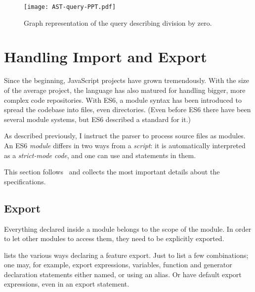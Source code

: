 \begin{figure}[!htb]
  \centering
  \texttt{[image: AST-query-PPT.pdf]}
  \caption{Graph representation of the query describing division by zero.}
  \label{fig:AST-query-PPT}
\end{figure}


\section{Handling Import and Export}
\label{sect:handling-import-export}
Since the beginning, JavaScript projects have grown tremendously. With the size of the average project, the language has also matured for handling bigger, more complex code repositories. With ES6, a module syntax has been introduced to spread the codebase into files, even directories. (Even before ES6 there have been several module systems, but ES6 described a standard for it.)

As described previously, I instruct the parser to process source files as modules. An ES6 \emph{module} differs in two ways from a \emph{script}: it is automatically interpreted as a \emph{strict-mode code}, and one can use  and  statements in them.

This section follows~\cite{ES6InDepth,ES6import,ES6export} and collects the most important details about the specifications.


\subsection{Export}
Everything declared inside a module belongs to the scope of the module. In order to let other modules to access them, they need to be explicitly exported.

 lists the various ways declaring a feature export. Just to list a few combinations; one may, for example, export expressions, variables, function and generator declaration statements either named, or using an alias. Or have default export expressions, even in an export statement.

\begin{figure}[htbp]
	\begin{minipage}{\textwidth}
		
	\end{minipage}
\end{figure}

